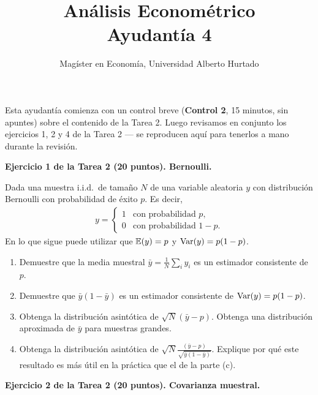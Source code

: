 \documentclass[letterpaper,11pt]{article}
\title{Análisis Econométrico \\ Ayudantía 4}
\author{Magíster en Economía, Universidad Alberto Hurtado}
\date{}
\begin{document}
\maketitle

\noindent Esta ayudantía comienza con un control breve (\textbf{Control 2}, 15 minutos, sin
apuntes) sobre el contenido de la Tarea 2. Luego revisamos en conjunto los ejercicios 1, 2 y 4
de la Tarea 2 --- se reproducen aquí para tenerlos a mano durante la revisión.

\vspace{1em}

\noindent\textbf{Ejercicio 1 de la Tarea 2 (20 puntos). Bernoulli.}

Dada una muestra i.i.d.\ de tamaño $N$ de una variable aleatoria $y$ con distribución Bernoulli
con probabilidad de éxito $p$. Es decir,
\begin{align*}
y = \begin{cases}
1 & \text{con probabilidad } p,\\
0 & \text{con probabilidad } 1-p.
\end{cases}
\end{align*}
En lo que sigue puede utilizar que $\operatorname{\mathbb{E}}(y)=p$ y $\operatorname{Var}(y)=p(1-p)$.
\begin{enumerate}
    \item Demuestre que la media muestral $\bar y=\frac{1}{N}\sum_i y_i$ es un estimador
    consistente de $p$.
    \item Demuestre que $\bar y(1-\bar y)$ es un estimador consistente de $\operatorname{Var}(y)=p(1-p)$.
    \item Obtenga la distribución asintótica de $\sqrt{N}(\bar y-p)$. Obtenga una distribución
    aproximada de $\bar y$ para muestras grandes.
    \item Obtenga la distribución asintótica de
    $\sqrt{N}\frac{(\bar y-p)}{\sqrt{\bar y(1-\bar y)}}$. Explique por qué este resultado es más
    útil en la práctica que el de la parte (c).
\end{enumerate}

\vspace{1em}

\noindent\textbf{Ejercicio 2 de la Tarea 2 (20 puntos). Covarianza muestral.}
\end{document}
